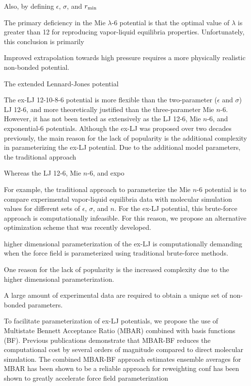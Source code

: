 \documentclass[11pt,a4paper]{article}
\begin{document}
Also, by defining $\epsilon$, $\sigma$, and $r_{\rm min}$ 

The primary deficiency in the Mie $\lambda$-6 potential is that the optimal value of $\lambda$ is greater than 12 for reproducing vapor-liquid equilibria properties. Unfortunately, this conclusion is primarily  

Improved extrapolation towards high pressure requires a more physically realistic non-bonded potential. 

The extended Lennard-Jones potential 

The ex-LJ 12-10-8-6 potential is more flexible than the two-parameter ($\epsilon$ and $\sigma$) LJ 12-6, and more theoretically justified than the three-parameter Mie $n$-6. However, it has not been tested as extensively as the LJ 12-6, Mie $n$-6, and exponential-6 potentials. Although the ex-LJ was proposed over two decades previously, the main reason for the lack of popularity is the additional complexity in parameterizing the ex-LJ potential. Due to the additional model parameters, the traditional approach

Whereas the LJ 12-6, Mie $n$-6, and expo

For example, the traditional approach to parameterize the Mie $n$-6 potential is to compare experimental vapor-liquid equilibria data with molecular simulation values for different sets of $\epsilon$, $\sigma$, and $n$. For the ex-LJ potential, this brute-force approach is computationally infeasible. For this reason, we propose an alternative optimization scheme that was recently developed.

higher dimensional parameterization of the ex-LJ is computationally demanding when the force field is parameterized using traditional brute-force methods.

One reason for the lack of popularity is the increased complexity due to the higher dimensional parameterization.

A large amount of experimental data are required to obtain a unique set of non-bonded parameters. 



To facilitate parameterization of ex-LJ potentials, we propose the use of Multistate Bennett Acceptance Ratio (MBAR) combined with basis functions (BF). Previous publications demonstrate that MBAR-BF reduces the computational cost by several orders of magnitude compared to direct molecular simulation. The combined MBAR-BF approach estimates ensemble averages for   MBAR has been shown to be a reliable approach for reweighting conf has been shown to greatly accelerate force field parameterization
\end{document}
